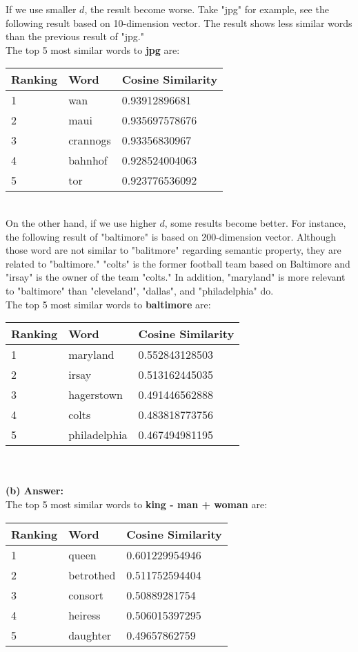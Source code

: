 \documentclass{article}
\begin{document}
\noindent
If we use smaller $d$, the result become worse. Take "jpg" for example, see the following result based on 10-dimension vector. The result shows less similar words than the previous result of "jpg."\\
\noindent
The top 5 most similar words to \textbf{jpg} are:\\
\begin{tabular}{ p{2.5cm}|p{2.5cm}|p{3cm}  }
 \hline
 Ranking & Word & Cosine Similarity\\
 \hline
1 & wan & 0.93912896681\\
2 & maui & 0.935697578676\\
3 & crannogs & 0.93356830967\\
4 & bahnhof & 0.928524004063\\
5 & tor & 0.923776536092\\
 \hline
\end{tabular}\\

\noindent
On the other hand, if we use higher $d$, some results become better. For instance, the following result of "baltimore" is based on 200-dimension vector. Although those word are not similar to "balitmore" regarding semantic property, they are related to "baltimore." "colts" is the former football team based on Baltimore and "irsay" is the owner of the team "colts." In addition, "maryland" is more relevant to "baltimore" than "cleveland", "dallas", and "philadelphia" do.\\

The top 5 most similar words to \textbf{baltimore} are:\\
\begin{tabular}{ p{2.5cm}|p{2.5cm}|p{3cm}  }
 \hline
 Ranking & Word & Cosine Similarity\\
 \hline
1 & maryland & 0.552843128503\\
2 & irsay & 0.513162445035\\
3 & hagerstown & 0.491446562888\\
4 & colts & 0.483818773756\\
5 & philadelphia & 0.467494981195\\
 \hline
\end{tabular}\\
\\

\noindent
\textbf{(b) Answer:}\\

The top 5 most similar words to \textbf{king - man + woman} are:\\
\begin{tabular}{ p{2.5cm}|p{2.5cm}|p{3cm}  }
 \hline
 Ranking & Word & Cosine Similarity\\
 \hline
1 & queen & 0.601229954946\\
2 & betrothed & 0.511752594404\\
3 & consort & 0.50889281754\\
4 & heiress & 0.506015397295\\
5 & daughter & 0.49657862759\\
 \hline
\end{tabular}\\
\end{document}
